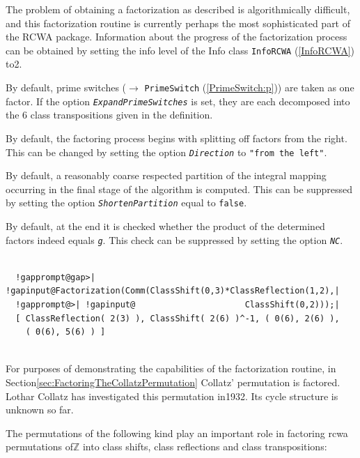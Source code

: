 \documentclass[a4paper,11pt]{report}
\begin{document}
{{{ The problem of obtaining a factorization as described is algorithmically
difficult, and this factorization routine is currently perhaps the most
sophisticated part of the \textsf{RCWA} package. Information about the progress of the factorization process can be
obtained by setting the info level of the Info class \texttt{InfoRCWA} (\ref{InfoRCWA}) to{\nobreakspace}2. 

 By default, prime switches ($\rightarrow$ \texttt{PrimeSwitch} (\ref{PrimeSwitch:p})) are taken as one factor. If the option \mbox{\texttt{\mdseries\slshape ExpandPrimeSwitches}} is set, they are each decomposed into the 6 class transpositions given in the
definition. 

 By default, the factoring process begins with splitting off factors from the
right. This can be changed by setting the option \mbox{\texttt{\mdseries\slshape Direction}} to \texttt{"from the left"}. 

 By default, a reasonably coarse respected partition of the integral mapping
occurring in the final stage of the algorithm is computed. This can be
suppressed by setting the option \mbox{\texttt{\mdseries\slshape ShortenPartition}} equal to \texttt{false}. 

 By default, at the end it is checked whether the product of the determined
factors indeed equals \mbox{\texttt{\mdseries\slshape g}}. This check can be suppressed by setting the option \mbox{\texttt{\mdseries\slshape NC}}. 
\begin{Verbatim}[commandchars=!@|,fontsize=\small,frame=single,label=Example]
  
  !gapprompt@gap>| !gapinput@Factorization(Comm(ClassShift(0,3)*ClassReflection(1,2),|
  !gapprompt@>| !gapinput@                      ClassShift(0,2)));|
  [ ClassReflection( 2(3) ), ClassShift( 2(6) )^-1, ( 0(6), 2(6) ), 
    ( 0(6), 5(6) ) ]
  
\end{Verbatim}
 }

 For purposes of demonstrating the capabilities of the factorization routine,
in Section{\nobreakspace}\ref{sec:FactoringTheCollatzPermutation} Collatz' permutation is factored. Lothar Collatz has investigated this
permutation in{\nobreakspace}1932. Its cycle structure is unknown so far. 

 The permutations of the following kind play an important role in factoring
rcwa permutations of{\nobreakspace}{\ensuremath{\mathbb Z}} into class shifts,
class reflections and class transpositions: 

}}
\end{document}
